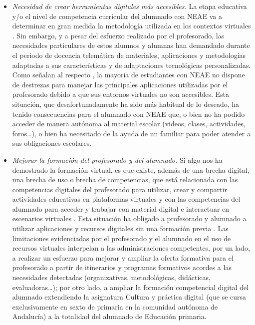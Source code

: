 \documentclass[spanish]{textolivre}
\begin{document}
\begin{itemize}
    \item \emph{Necesidad de crear herramientas digitales más accesibles.} 
    La etapa educativa y/o el nivel de competencia curricular del alumnado con NEAE va a determinar en gran medida la metodología utilizada en los contextos virtuales \cite{menendez2020}. %
    Sin embargo, y a pesar del esfuerzo realizado por el profesorado, las necesidades particulares de estos alumnos y alumnas han demandado durante el periodo de docencia telemática de materiales, aplicaciones y metodologías adaptadas a sus características y de adaptaciones tecnológicas personalizadas. Como señalan al respecto \textcite{vega2020}, %
    la mayoría de estudiantes con NEAE no dispone de destrezas para manejar las principales aplicaciones utilizadas por el profesorado debido a que sus entornos virtuales no son accesibles. Esta situación, que desafortunadamente ha sido más habitual de lo deseado, ha tenido consecuencias para el alumnado con NEAE que, o bien no ha podido acceder de manera autónoma al material escolar (videos, clases, actividades, foros…), o bien ha necesitado de la ayuda de un familiar para poder atender a sus obligaciones escolares. 
    
    \item \emph{Mejorar la formación del profesorado y del alumnado.} 
    Si algo nos ha demostrado la formación virtual, es que existe, además de una brecha digital, una brecha de uso \cite{fernandezenguita2020} %
    o brecha de competencias, que está relacionada con las competencias digitales del profesorado para utilizar, crear y compartir actividades educativas en plataformas virtuales y con las competencias del alumnado para acceder y trabajar con material digital e interactuar en escenarios virtuales \cite{garciapenalvo2020}. %
    Esta situación ha obligado a profesorado y alumnado a utilizar aplicaciones y recursos digitales sin una formación previa \cite{rogero2020}. %
    Las limitaciones evidenciadas por el profesorado y el alumnado en el uso de recursos virtuales interpelan a las administraciones competentes, por un lado, a realizar un esfuerzo para mejorar y ampliar la oferta formativa para el profesorado a partir de itinerarios y programas formativos acordes a las necesidades detectadas (organizativas, metodológicas, didácticas, evaluadoras…); por otro lado, a ampliar la formación competencial digital del alumnado extendiendo la asignatura Cultura y práctica digital (que se cursa exclusivamente en sexto de primaria en la comunidad autónoma de Andalucía) a la totalidad del alumnado de Educación primaria.
\end{itemize}
\end{document}
